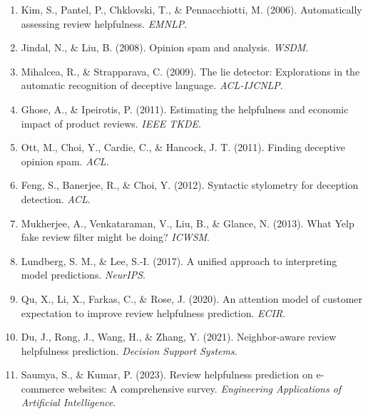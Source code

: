 \documentclass[12pt]{article}
\begin{document}
\begin{enumerate}
\item Kim, S., Pantel, P., Chklovski, T., \& Pennacchiotti, M. (2006). Automatically assessing review helpfulness. \emph{EMNLP}.
\item Jindal, N., \& Liu, B. (2008). Opinion spam and analysis. \emph{WSDM}.
\item Mihalcea, R., \& Strapparava, C. (2009). The lie detector: Explorations in the automatic recognition of deceptive language. \emph{ACL-IJCNLP}.
\item Ghose, A., \& Ipeirotis, P. (2011). Estimating the helpfulness and economic impact of product reviews. \emph{IEEE TKDE}.
\item Ott, M., Choi, Y., Cardie, C., \& Hancock, J. T. (2011). Finding deceptive opinion spam. \emph{ACL}.
\item Feng, S., Banerjee, R., \& Choi, Y. (2012). Syntactic stylometry for deception detection. \emph{ACL}.
\item Mukherjee, A., Venkataraman, V., Liu, B., \& Glance, N. (2013). What Yelp fake review filter might be doing? \emph{ICWSM}.
\item Lundberg, S. M., \& Lee, S.-I. (2017). A unified approach to interpreting model predictions. \emph{NeurIPS}.
\item Qu, X., Li, X., Farkas, C., \& Rose, J. (2020). An attention model of customer expectation to improve review helpfulness prediction. \emph{ECIR}.
\item Du, J., Rong, J., Wang, H., \& Zhang, Y. (2021). Neighbor-aware review helpfulness prediction. \emph{Decision Support Systems}.
\item Saumya, S., \& Kumar, P. (2023). Review helpfulness prediction on e-commerce websites: A comprehensive survey. \emph{Engineering Applications of Artificial Intelligence}.
\end{enumerate}
\end{document}
